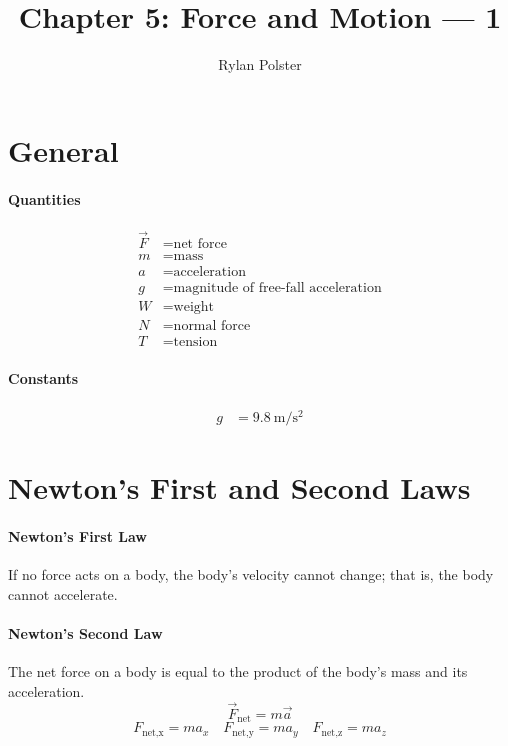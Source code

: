 \documentclass{article}
\title{Chapter 5: Force and Motion — 1}
\author{Rylan Polster}
\begin{document}
    \maketitle
    
    \section*{General}

        \paragraph{Quantities}
        \begin{align}
            \vec{F} &= \text{net force} \nonumber\\
            m &= \text{mass} \nonumber\\
            a &= \text{acceleration} \nonumber\\
            g &= \text{magnitude of free-fall acceleration} \nonumber\\
            W &= \text{weight} \nonumber\\
            N &= \text{normal force} \nonumber\\
            T &= \text{tension} \nonumber
        \end{align}

        \paragraph{Constants}
        \begin{align}
            g &= \SI[per-mode=symbol]{9.8}{\meter\per\square\second} \nonumber
        \end{align}

    \section{Newton's First and Second Laws}

        \paragraph{Newton's First Law}
        If no force acts on a body, the body's velocity cannot change; that is, the body cannot accelerate.

        \paragraph{Newton's Second Law}
        The net force on a body is equal to the product of the body's mass and its acceleration.
        \begin{equation}
            \vec{F}_\text{net} = m \vec{a}
        \end{equation}
        \begin{equation}
            F_\text{net,x} = m a_x \quad F_\text{net,y} = m a_y \quad F_\text{net,z} = m a_z
        \end{equation}
\end{document}
